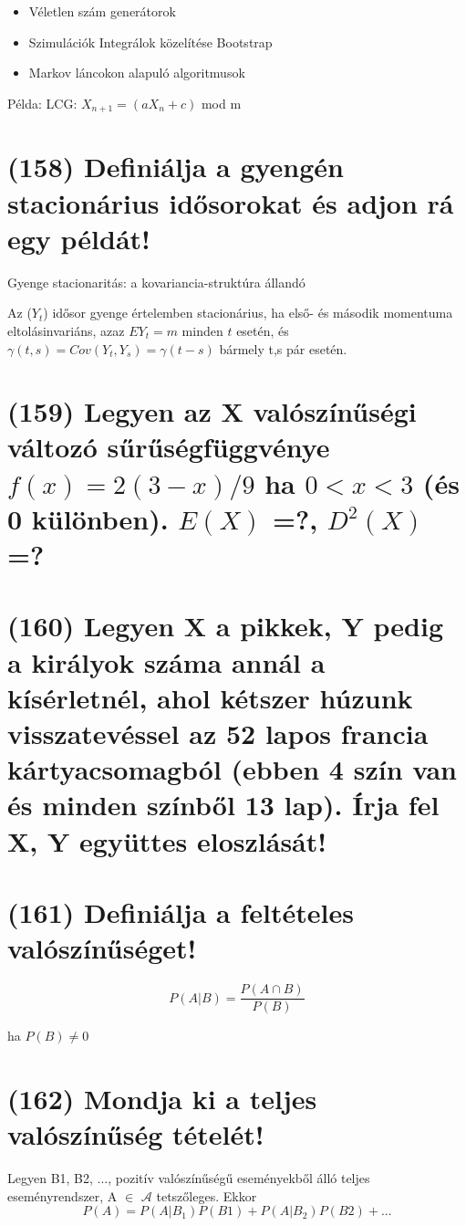 \documentclass[12p]{article}
\begin{document}
\begin{itemize}
	\item Véletlen szám generátorok
	\item Szimulációk
	\subitem Integrálok közelítése
	\subitem Bootstrap
	\item Markov láncokon alapuló algoritmusok
\end{itemize}

Példa: LCG: $X_{n+1} = (aX_n + c)$ mod m

\section{(158) Definiálja a gyengén stacionárius idősorokat és adjon rá egy példát!}

Gyenge stacionaritás: a kovariancia-struktúra állandó

Az ($Y_t$) idősor gyenge értelemben stacionárius, ha első- és második momentuma eltolásinvariáns, azaz $EY_t = m$ minden $t$ esetén, és $\gamma(t,s) = Cov(Y_t, Y_s) = \gamma(t - s)$ bármely t,s pár esetén.

\section{(159) Legyen az X valószínűségi változó sűrűségfüggvénye $f(x) = 2(3 - x)/9$ ha $0 < x < 3$ (és 0 különben). $E(X)$ =?, $D^2(X)$ =? }

\section{(160) Legyen X a pikkek, Y pedig a királyok száma annál a kísérletnél, ahol kétszer húzunk
visszatevéssel az 52 lapos francia kártyacsomagból (ebben 4 szín van és minden színből 13
lap). Írja fel X, Y együttes eloszlását!}

\section{(161) Definiálja a feltételes valószínűséget!}

$$P(A|B) = \frac{P(A \cap B)}{P(B)}$$

ha $P(B) \neq 0$

\section{(162) Mondja ki a teljes valószínűség tételét!}

Legyen B1, B2, ..., pozitív valószínűségű eseményekből álló teljes eseményrendszer, A $\in$ $\mathscr{A}$ tetszőleges. Ekkor
$$P(A) = P(A|B_1)P(B1)+P(A|B_2)P(B2)+ ...$$
\end{document}
